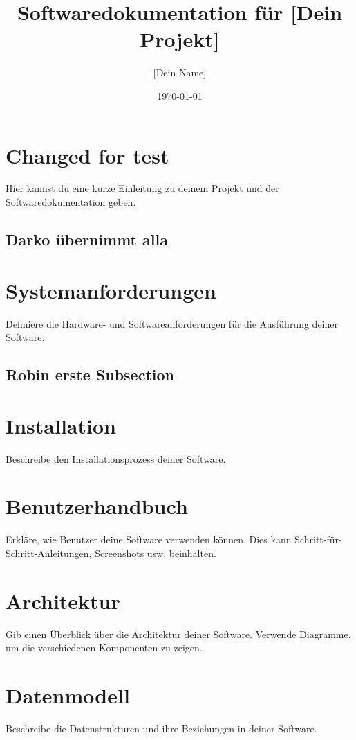 \documentclass[a4paper, 12pt]{article}
\title{Softwaredokumentation für [Dein Projekt]}
\author{[Dein Name]}
\date{\today}
\begin{document}
    \maketitle
    \tableofcontents
    \newpage

    \section{Changed for test}
    Hier kannst du eine kurze Einleitung zu deinem Projekt und der Softwaredokumentation geben.
    
    \subsection{Darko übernimmt alla}

    \section{Systemanforderungen}
    Definiere die Hardware- und Softwareanforderungen für die Ausführung deiner Software.

    \subsection{Robin erste Subsection}

    \section{Installation}
    Beschreibe den Installationsprozess deiner Software.

    \section{Benutzerhandbuch}
    Erkläre, wie Benutzer deine Software verwenden können. Dies kann Schritt-für-Schritt-Anleitungen, Screenshots usw. beinhalten.

    \section{Architektur}
    Gib einen Überblick über die Architektur deiner Software. Verwende Diagramme, um die verschiedenen Komponenten zu zeigen.

    \section{Datenmodell}
    Beschreibe die Datenstrukturen und ihre Beziehungen in deiner Software.
\end{document}
